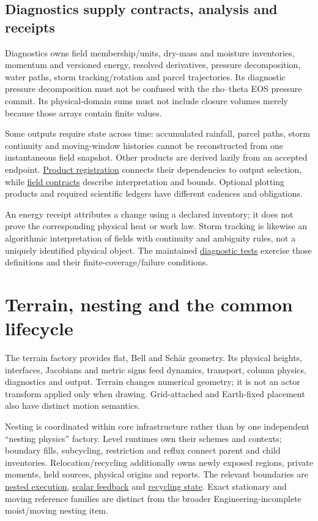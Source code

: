\subsection{Diagnostics supply contracts, analysis and receipts}

Diagnostics owns field membership/units, dry-mass and moisture inventories,
momentum and versioned energy, resolved derivatives, pressure decomposition,
water paths, storm tracking/rotation and parcel trajectories. Its diagnostic
pressure decomposition must not be confused with the rho--theta EOS pressure
commit. Its physical-domain sums must not include closure volumes merely
because those arrays contain finite values.

Some outputs require state across time: accumulated rainfall, parcel paths,
storm continuity and moving-window histories cannot be reconstructed from
one instantaneous field snapshot. Other products are derived lazily from an
accepted endpoint. \href{../src/diagnostics/derived/tranche_product_registry.cpp}{Product
registration} connects their dependencies to output selection, while
\href{../src/diagnostics/contracts/field_contract.cpp}{field contracts}
describe interpretation and bounds. Optional plotting products and required
scientific ledgers have different cadences and obligations.

An energy receipt attributes a change using a declared inventory; it does not
prove the corresponding physical heat or work law. Storm tracking is likewise
an algorithmic interpretation of fields with continuity and ambiguity rules,
not a uniquely identified physical object. The maintained
\href{../tests/diagnostics}{diagnostic tests} exercise those definitions and
their finite-coverage/failure conditions.

\section{Terrain, nesting and the common lifecycle}

The terrain factory provides flat, Bell and Sch\"ar geometry. Its physical
heights, interfaces, Jacobians and metric signs feed dynamics, transport,
column physics, diagnostics and output. Terrain changes numerical geometry;
it is not an actor transform applied only when drawing. Grid-attached and
Earth-fixed placement also have distinct motion semantics.

Nesting is coordinated within core infrastructure rather than by one independent
``nesting physics'' factory. Level runtimes own their schemes and contexts;
boundary fills, subcycling, restriction and reflux connect parent and child
inventories. Relocation/recycling additionally owns newly exposed regions,
private moments, held sources, physical origins and reports. The relevant
boundaries are \href{../src/core/infra/nested_execution.cpp}{nested execution},
\href{../src/core/infra/nested_scalar_feedback.cpp}{scalar feedback} and
\href{../src/core/infra/domain_recycling_state.cpp}{recycling state}.
Exact stationary and moving reference families are distinct from the broader
Engineering-incomplete moist/moving nesting item.

